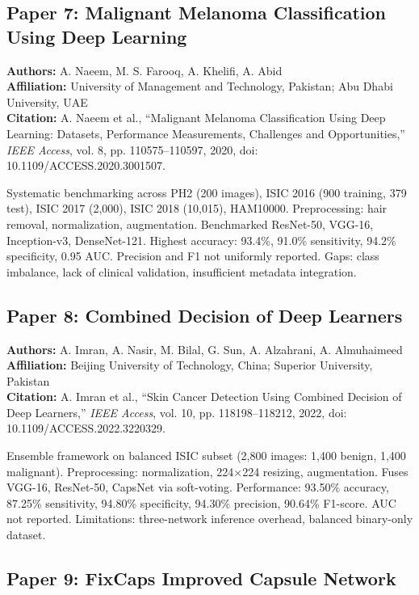 \documentclass[conference]{IEEEtran}
\begin{document}
\subsection{Paper 7: Malignant Melanoma Classification Using Deep Learning}

\noindent\textbf{Authors:} A. Naeem, M. S. Farooq, A. Khelifi, A. Abid\\
\textbf{Affiliation:} University of Management and Technology, Pakistan; Abu Dhabi University, UAE\\
\textbf{Citation:} A. Naeem et al., ``Malignant Melanoma Classification Using Deep Learning: Datasets, Performance Measurements, Challenges and Opportunities,'' \textit{IEEE Access}, vol. 8, pp. 110575--110597, 2020, doi: 10.1109/ACCESS.2020.3001507.

Systematic benchmarking across PH2 (200 images), ISIC 2016 (900 training, 379 test), ISIC 2017 (2,000), ISIC 2018 (10,015), HAM10000. Preprocessing: hair removal, normalization, augmentation. Benchmarked ResNet-50, VGG-16, Inception-v3, DenseNet-121. Highest accuracy: 93.4\%, 91.0\% sensitivity, 94.2\% specificity, 0.95 AUC. Precision and F1 not uniformly reported. Gaps: class imbalance, lack of clinical validation, insufficient metadata integration.

\subsection{Paper 8: Combined Decision of Deep Learners}

\noindent\textbf{Authors:} A. Imran, A. Nasir, M. Bilal, G. Sun, A. Alzahrani, A. Almuhaimeed\\
\textbf{Affiliation:} Beijing University of Technology, China; Superior University, Pakistan\\
\textbf{Citation:} A. Imran et al., ``Skin Cancer Detection Using Combined Decision of Deep Learners,'' \textit{IEEE Access}, vol. 10, pp. 118198--118212, 2022, doi: 10.1109/ACCESS.2022.3220329.

Ensemble framework on balanced ISIC subset (2,800 images: 1,400 benign, 1,400 malignant). Preprocessing: normalization, 224×224 resizing, augmentation. Fuses VGG-16, ResNet-50, CapsNet via soft-voting. Performance: 93.50\% accuracy, 87.25\% sensitivity, 94.80\% specificity, 94.30\% precision, 90.64\% F1-score. AUC not reported. Limitations: three-network inference overhead, balanced binary-only dataset.

\subsection{Paper 9: FixCaps Improved Capsule Network}
\end{document}
